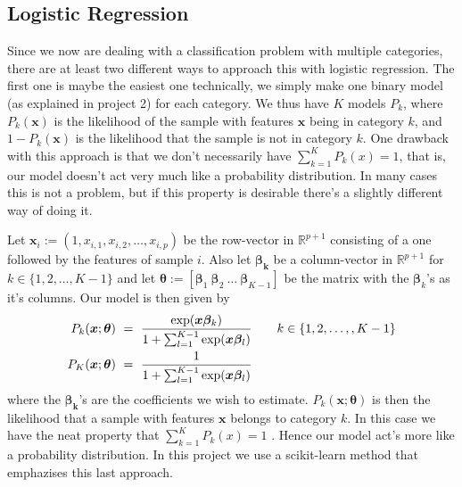 \documentclass[parskip=half]{scrartcl}
\theoremstyle{definition}
\theoremstyle{remark}
\newcommand{\R}{\mathbb{R}}
\begin{document}
\subsection{Logistic Regression}
Since we now are dealing with a classification problem with multiple
categories, there are at least two different ways to approach this with
logistic regression. 
The first one is maybe the easiest one technically, we simply make
one binary model (as explained in project 2) 
for each category. We thus have $K$ models $P_k$, 
where $P_k(\bm{x})$ is the likelihood of the sample with 
features $\bm{x}$ being in category $k$, and $1 - P_k(\bm{x})$ is
the likelihood that the sample is not in category $k$. One 
drawback with this approach is that we don't necessarily
have $\sum_{k=1}^K P_k(x) = 1$, that is, our model doesn't
act very much like a probability distribution. 
In many cases this is not a problem, but if this property is desirable
there's a slightly different way of doing it.
\par
Let $\bm{x}_i := (1, x_{i,1}, x_{i,2}, \dots, x_{i,p})$ 
be the row-vector in $\R^{p+1}$ consisting of a one followed by the 
features of sample $i$. Also let $\bm{\beta_k}$ be a column-vector in 
$\R^{p+1}$ for $k \in \{1,2, \dots, K-1\}$ and let 
$\bm{\theta} := [\bm{\beta}_1 \ \bm{\beta}_2 \ \dots \ \bm{\beta}_{K-1}]$ 
be the matrix with the $\bm{\beta}_k$'s as it's columns.
Our model is then given by
\begin{equation}
    \begin{split}
        P_k(\bm{x}; \bm{\theta}) \ = \ 
        \frac{\exp(\bm{x \beta}_k)}
        {1 + \sum_{l=1}^{K-1} \exp(\bm{x\beta_}l)}
        & \quad \quad k \in \{1,2, \dots, ,K - 1\}  \\
        P_K(\bm{x}; \bm{\theta}) \ = \ 
        \frac{1}
        {1 + \sum_{l=1}^{K-1} \exp(\bm{x\beta_}l)}
    \end{split}
\end{equation}
where the ${\bm{\beta_k}}$'s are the 
coefficients we wish to estimate. $P_k(\bm{x}; \bm{\theta})$ is then the 
likelihood that a sample with features $\bm{x}$ belongs to category $k$.
In this case we have the neat property that $\sum_{k=1}^K P_k(x) = 1$
\cite{htf:esl}.
Hence our model act's more like a probability distribution. In this project
we use a scikit-learn method that emphazises this last approach.
\par
\end{document}
